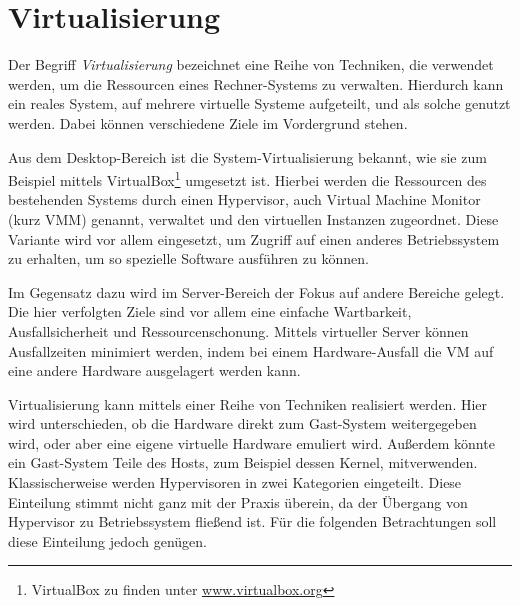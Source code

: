 \documentclass[
  a4paper,					    %
  twoside,
  DIV=calc,     				%
  bibliography=totoc,
  cleardoublepage=empty,
  ngerman,     					%
  final       					%
]{scrbook}
\begin{document}
\section{Virtualisierung}
\label{sec:Virtualisierung}
Der Begriff \emph{Virtualisierung} bezeichnet eine Reihe von Techniken, die verwendet werden, um die Ressourcen eines Rechner-Systems zu verwalten. Hierdurch kann ein reales System, auf mehrere virtuelle Systeme aufgeteilt, und als solche genutzt werden. Dabei können verschiedene Ziele im Vordergrund stehen.

Aus dem Desktop-Bereich ist die System-Virtualisierung bekannt, wie sie zum Beispiel mittels VirtualBox\footnote{VirtualBox zu finden unter \url{www.virtualbox.org}} umgesetzt ist. Hierbei werden die Ressourcen des bestehenden Systems durch einen Hypervisor, auch Virtual Machine Monitor (kurz VMM) genannt, verwaltet und den virtuellen Instanzen zugeordnet. Diese Variante wird vor allem eingesetzt, um Zugriff auf einen anderes Betriebssystem zu erhalten, um so spezielle Software ausführen zu können.

Im Gegensatz dazu wird im Server-Bereich der Fokus auf andere Bereiche gelegt. Die hier verfolgten Ziele sind vor allem eine einfache Wartbarkeit, Ausfallsicherheit und Ressourcenschonung. Mittels virtueller Server können Ausfallzeiten minimiert werden, indem bei einem Hardware-Ausfall die VM auf eine andere Hardware ausgelagert werden kann.

Virtualisierung kann mittels einer Reihe von Techniken realisiert werden. Hier wird unterschieden, ob die Hardware direkt zum Gast-System weitergegeben wird, oder aber eine eigene virtuelle Hardware emuliert wird. Außerdem könnte ein Gast-System Teile des Hosts, zum Beispiel dessen Kernel, mitverwenden. Klassischerweise werden Hypervisoren in zwei Kategorien eingeteilt\cite[Seite 22 ff.]{hypervisor}. Diese Einteilung stimmt nicht ganz mit der Praxis überein, da der Übergang von Hypervisor zu Betriebssystem fließend ist. Für die folgenden Betrachtungen soll diese Einteilung jedoch genügen.
\end{document}
